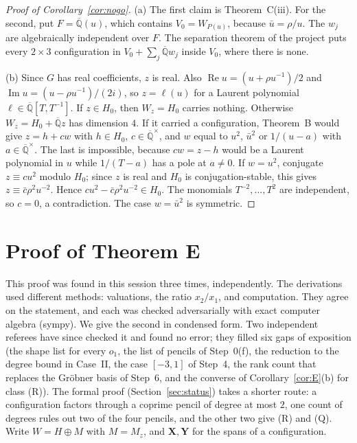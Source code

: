 \documentclass[11pt,a4paper]{article}
\theoremstyle{plain}
\theoremstyle{definition}
\newcommand{\Qbar}{\overline{\mathbb{Q}}}
\renewcommand{\Re}{\operatorname{Re}}
\renewcommand{\Im}{\operatorname{Im}}
\begin{document}
\begin{proof}[Proof of Corollary~\ref{cor:nogo}]
(a) The first claim is Theorem~C(iii). For the second, put $F=\Qbar(u)$, which contains
$V_{0}=W_{P(u)}$, because $\bar u=\rho/u$. The $w_{j}$ are algebraically independent over $F$.
The separation theorem of the project \cite[Thm.~10.16]{BP} puts every $2\times3$
configuration in $V_{0}+\sum_{j}\Qbar w_{j}$ inside $V_{0}$, where there is none.

(b) Since $G$ has real coefficients, $z$ is real. Also
$\Re u=(u+\rho u^{-1})/2$ and $\Im u=(u-\rho u^{-1})/(2i)$, so $z=\ell(u)$ for a Laurent
polynomial $\ell\in\Qbar[T,T^{-1}]$. If $z\in H_{0}$, then $W_{z}=H_{0}$ carries nothing.
Otherwise $W_{z}=H_{0}+\Qbar z$ has dimension $4$. If it carried a configuration,
Theorem~B \cite[Thm.~10.6]{BP} would give $z=h+cw$ with $h\in H_{0}$,
$c\in\Qbar^{\times}$, and $w$ equal to $u^{2}$, $\bar u^{2}$ or $1/(u-a)$ with
$a\in\Qbar^{\times}$. The last is impossible, because $cw=z-h$ would be a Laurent
polynomial in $u$ while $1/(T-a)$ has a pole at $a\neq0$. If $w=u^{2}$, conjugate
$z\equiv cu^{2}$ modulo $H_{0}$; since $z$ is real and $H_{0}$ is conjugation-stable, this
gives $z\equiv\bar c\rho^{2}u^{-2}$. Hence $cu^{2}-\bar c\rho^{2}u^{-2}\in H_{0}$. The monomials
$T^{-2},\dots,T^{2}$ are independent, so $c=0$, a contradiction. The case $w=\bar u^{2}$
is symmetric.
\end{proof}

\section{Proof of Theorem E}\label{sec:proofE}

This proof was found in this session three times, independently. The derivations used
different methods: valuations, the ratio $x_{2}/x_{1}$, and computation. They agree on the
statement, and each was checked adversarially with exact computer algebra (sympy). We
give the second in condensed form. Two independent referees have since checked it and found no
error; they filled six gaps of exposition (the shape list for every $o_{1}$, the list of pencils of Step~0(f), the
reduction to the degree bound in Case~II, the case $[-3,1]$ of Step~4, the rank count that replaces the Gr\"obner
basis of Step~6, and the converse of Corollary~\ref{cor:E}(b) for class (R)). The formal proof
(Section~\ref{sec:status}) takes a shorter route: a configuration factors through a coprime pencil of degree at
most $2$, one count of degrees rules out two of the four pencils, and the other two give (R) and (Q). Write $W=H\oplus M$ with $M=M_{z}$, and $\mathbf X,\mathbf Y$ for the spans
of a configuration.
\end{document}
